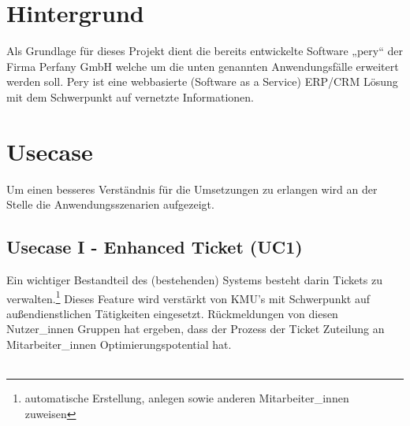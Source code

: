 \documentclass[Bachelorarbeit.tex]{subfiles}
\begin{document}
\section{Hintergrund}
\label{chap:einfuehrung:sec:hintergrund}
Als Grundlage für dieses Projekt dient die bereits entwickelte Software „pery“ der Firma Perfany GmbH welche um die unten genannten Anwendungsfälle erweitert werden soll. Pery ist eine webbasierte (Software as a Service) ERP/CRM Lösung mit dem Schwerpunkt auf vernetzte Informationen. 

\section{Usecase}

Um einen besseres Verständnis für die Umsetzungen zu erlangen wird an der Stelle die Anwendungsszenarien aufgezeigt.



\subsection{Usecase I - Enhanced Ticket (\ac{UC}1)}
Ein wichtiger Bestandteil des (bestehenden) Systems besteht darin Tickets zu verwalten.\footnote{automatische Erstellung, anlegen sowie anderen Mitarbeiter\_innen zuweisen}
Dieses Feature wird verstärkt von \ac{KMU}’s mit Schwerpunkt auf außendienstlichen Tätigkeiten eingesetzt. 
Rückmeldungen von diesen Nutzer\_innen Gruppen hat ergeben, dass der Prozess der Ticket Zuteilung an Mitarbeiter\_innen Optimierungspotential hat. \\
\\
\end{document}
